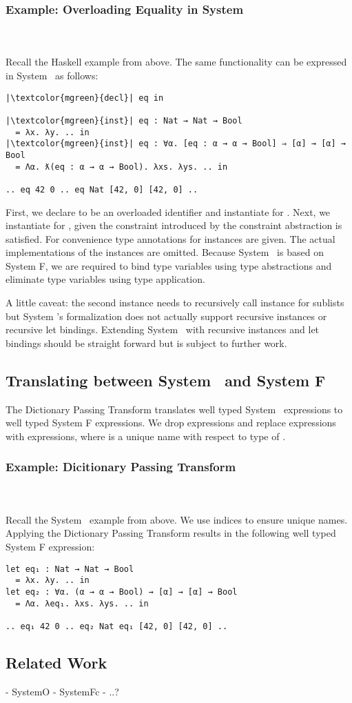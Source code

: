 \subsubsection{Example: Overloading Equality in System \Fo}\hfill\\\\
Recall the Haskell example from above. The same functionality can be expressed in System \Fo\ as follows: 
\begin{verbatim}
|\textcolor{mgreen}{decl}| eq in

|\textcolor{mgreen}{inst}| eq : Nat → Nat → Bool 
  = λx. λy. .. in
|\textcolor{mgreen}{inst}| eq : ∀α. [eq : α → α → Bool] ⇒ [α] → [α] → Bool 
  = Λα. ƛ(eq : α → α → Bool). λxs. λys. .. in

.. eq 42 0 .. eq Nat [42, 0] [42, 0] .. 
\end{verbatim}
First, we declare  to be an overloaded identifier and instantiate  for . 
Next, we instantiate  for \mono{[α]}, given the constraint introduced by the constraint abstraction  is satisfied.  
For convenience type annotations for instances are given. 
The actual implementations of the instances are omitted.
Because System \Fo\ is based on System F, we are required to bind type variables using type abstractions  and eliminate type variables using type application. 

\noindent A little caveat: the second instance needs to recursively call instance  for sublists but System \Fo's formalization does not actually support recursive instances or recursive let bindings. Extending System \Fo\ with recursive instances and let bindings should be straight forward but is subject to further work.
\subsection{Translating between System \Fo\ and System F}
The Dictionary Passing Transform translates well typed System \Fo\ expressions to well typed System F expressions. 
We drop  expressions and replace  expressions with  expressions, where  is a unique name with respect to type  of .
\subsubsection{Example: Dicitionary Passing Transform}\hfill\\\\
Recall the System \Fo\ example from above. We use indices to ensure unique names.
Applying the Dictionary Passing Transform results in the following well typed System F expression:
\begin{verbatim}  
let eq₁ : Nat → Nat → Bool 
  = λx. λy. .. in
let eq₂ : ∀α. (α → α → Bool) → [α] → [α] → Bool 
  = Λα. λeq₁. λxs. λys. .. in

.. eq₁ 42 0 .. eq₂ Nat eq₁ [42, 0] [42, 0] .. 
\end{verbatim}

\subsection{Related Work}
- SystemO
- SystemFc
- ..?